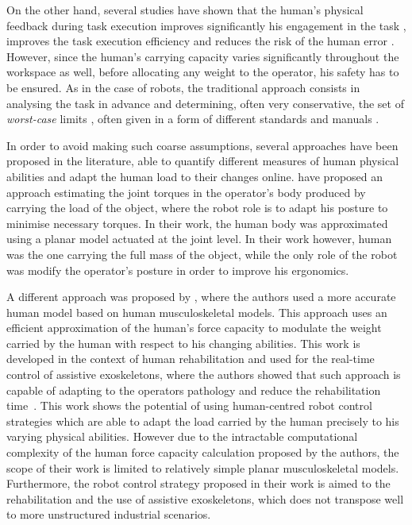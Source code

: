 On the other hand, several studies have shown that the human's physical feedback during task execution improves significantly his engagement in the task \cite{rani2007operator}, improves the task execution efficiency and reduces the risk of the human error \cite{BYRNE1996249}. However, since the human's carrying capacity varies significantly throughout the workspace as well, before allocating any weight to the operator, his safety has to be ensured. As in the case of robots, the traditional approach consists in analysing the task in advance and determining, often very conservative, the set of \textit{worst-case} limits \cite{shoaf1997comprehensive}, often given in a form of different standards \cite{nasa} and manuals \cite{health1992manual}. 

In order to avoid making such coarse assumptions, several approaches have been proposed in the literature, able to quantify different measures of human physical abilities and adapt the human load to their changes online. \citet{Kim2018} have proposed an approach estimating the joint torques in the operator's body produced by carrying the load of the object, where the robot role is to adapt his posture to minimise necessary torques. In their work, the human body was approximated using a planar model actuated at the joint level. In their work however, human was the one carrying the full mass of the object, while the only role of the robot was modify the operator's posture in order to improve his ergonomics.

A different approach was proposed by \citet{carmichael2013admittance}, where the authors used a more accurate human model based on human musculoskeletal models. This approach uses an efficient approximation of the human's force capacity to modulate the weight carried by the human with respect to his changing abilities. This work is developed in the context of human rehabilitation and used for the real-time control of assistive exoskeletons, where the authors showed that such approach is capable of adapting to the operators pathology and reduce the rehabilitation time~\cite{Carmichael2013Experimental}. 
This work shows the potential of using human-centred robot control strategies which are able to adapt the load carried by the human precisely to his varying physical abilities. However due to the intractable computational complexity of the human force capacity calculation proposed by the authors, the scope of their work is limited to relatively simple planar musculoskeletal models. Furthermore, the robot control strategy proposed in their work is aimed to the rehabilitation and the use of assistive exoskeletons, which does not transpose well to more unstructured industrial scenarios.

